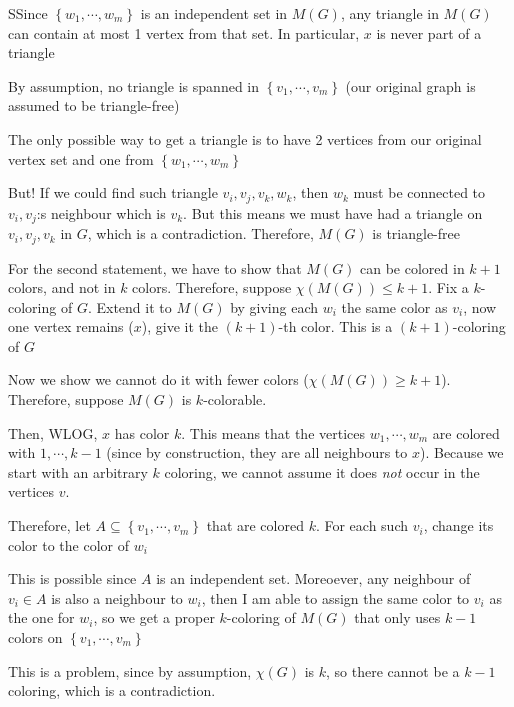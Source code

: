 \begin{prf}
  SSince $\left\{w_1,\cdots,w_m\right\}$ is an independent set in $M(G)$, any triangle in $M(G)$ can contain at most 1 vertex from that set. In particular, $x$ is never part of a triangle
  \par\bigskip
  \noindent By assumption, no triangle is spanned in $\left\{v_1,\cdots,v_m\right\}$ (our original graph is assumed to be triangle-free)
  \par\bigskip
  \noindent The only possible way to get a triangle is to have 2 vertices from our original vertex set and one from $\left\{w_1,\cdots,w_m\right\}$
  \par\bigskip
  \noindent But! If we could find such triangle $v_i,v_j,v_k,w_k$, then $w_k$ must be connected to $v_i, v_j$:s neighbour which is $v_k$. But this means we must have had a triangle on $v_i,v_j,v_k$ in $G$, which is a contradiction. Therefore, $M(G)$ is triangle-free
  \par\bigskip
  \par\bigskip
  \noindent For the second statement, we have to show that $M(G)$ can be colored in $k+1$ colors, and not in $k$ colors. Therefore, suppose $\chi(M(G))\leq k+1$. Fix a $k$-coloring of $G$. Extend it to $M(G)$ by giving each $w_i$ the same color as $v_i$, now one vertex remains ($x$), give it the $(k+1)$-th color. This is a $(k+1)$-coloring of $G$
  \par\bigskip
  \noindent Now we show we cannot do it with fewer colors ($\chi(M(G))\geq k+1$). Therefore, suppose $M(G)$ is $k$-colorable. \par
  \noindent Then, WLOG, $x$ has color $k$. This means that the vertices $w_1,\cdots,w_m$ are colored with $1,\cdots,k-1$ (since by construction, they are all neighbours to $x$). Because we start with an arbitrary $k$ coloring, we cannot assume it does \textit{not} occur in the vertices $v$.\par
  \noindent Therefore, let $A\subseteq\left\{v_1,\cdots,v_m\right\}$ that are colored $k$. For each such $v_i$, change its color to the color of $w_i$\par
  \noindent This is possible since $A$ is an independent set. Moreoever, any neighbour of $v_i\in A$ is also a neighbour to $w_i$, then I am able to assign the same color to $v_i$ as the one for $w_i$, so we get a proper $k$-coloring of $M(G)$ that only uses $k-1$ colors on $\left\{v_1,\cdots,v_m\right\}$
  \par\bigskip
  \noindent This is a problem, since by assumption, $\chi(G)$ is $k$, so there cannot be a $k-1$ coloring, which is a contradiction.
\end{prf}
